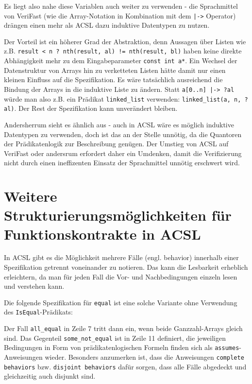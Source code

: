 Es liegt also nahe diese Variablen auch weiter zu verwenden - die Sprachmittel von VeriFast (wie die Array-Notation in Kombination mit dem
\lstinline{|->} Operator) drängen einen mehr als ACSL dazu induktive Datentypen zu nutzen.

Der Vorteil ist ein höherer Grad der Abstraktion, denn Aussagen über Listen wie z.B.
\lstinline{result < n ? nth(result, al) != nth(result, bl)} haben keine direkte Abhängigkeit mehr zu
dem Eingabeparameter \lstinline{const int a*}. Ein Wechsel der Datenstruktur von Arrays
hin zu verketteten Listen hätte damit nur einen kleinen Einfluss auf die Spezifikation. Es wäre tatsächlich 
ausreichend die Bindung der Arrays in die induktive Liste zu ändern. Statt \lstinline{a[0..n] |-> ?al} würde man also
z.B. ein Prädikat \lstinline{linked_list} verwenden: \lstinline{linked_list(a, n, ?al)}. Der Rest der 
Spezifikation kann unverändert bleiben.

Andersherrum sieht es ähnlich aus - auch in ACSL wäre es möglich induktive Datentypen zu verwenden, doch
ist das an der Stelle unnötig, da die Quantoren der Prädikatenlogik zur Beschreibung genügen. 
Der Umstieg von ACSL auf VeriFast oder andersrum erfordert daher ein Umdenken, damit die Verifizierung 
nicht durch einen ineffizenten Einsatz der Sprachmittel unnötig erschwert wird.



\section{Weitere Strukturierungsmöglichkeiten für Funktionskontrakte in ACSL}
\label{sec:design-by-contract:behaviors}

In ACSL gibt es die Möglichkeit mehrere Fälle (engl. behavior) innerhalb einer Spezifikation getrennt voneinander zu
notieren. Das kann die Lesbarkeit erheblich erleichtern, da man für jeden Fall die Vor- und Nachbedingungen
einzeln lesen und verstehen kann.

Die folgende Spezifikation für \texttt{equal} ist eine solche Variante ohne Verwendung des 
\lstinline{IsEqual}-Prädikats:



Der Fall \lstinline{all_equal} in Zeile 7 tritt dann ein, wenn beide Ganzzahl-Arrays gleich sind. Das 
Gegenteil \lstinline{some_not_equal} ist in Zeile 11 definiert, die jeweiligen Bedingungen in Form von
prädikatenlogischen Formeln finden sich als \lstinline{assumes}-Anweisungen wieder. Besonders anzumerken ist,
dass die Anweisungen \lstinline{complete behaviors} bzw. \lstinline{disjoint behaviors} dafür sorgen, dass
alle Fälle abgedeckt und gleichzeitig auch disjunkt sind.

